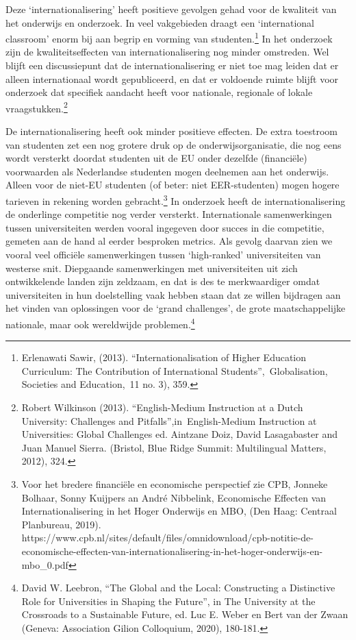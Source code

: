 \documentclass[empirical, authordate, ]{new-jote-article}
\begin{document}
	Deze ‘internationalisering' heeft positieve gevolgen gehad voor de kwaliteit van het onderwijs en onderzoek. In veel vakgebieden draagt een ‘international classroom' enorm bij aan begrip en vorming van studenten.\footnote{Erlenawati Sawir, (2013). “Internationalisation of Higher Education Curriculum: The Contribution of International Students”, Globalisation, Societies and Education, 11 no. 3), 359. } In het onderzoek zijn de kwaliteitseffecten van internationalisering nog minder omstreden. Wel blijft een discussiepunt dat de internationalisering er niet toe mag leiden dat er alleen internationaal wordt gepubliceerd, en dat er voldoende ruimte blijft voor onderzoek dat specifiek aandacht heeft voor nationale, regionale of lokale vraagstukken.\footnote{Robert Wilkinson (2013). “English-Medium Instruction at a Dutch University: Challenges and Pitfalls”,in English-Medium Instruction at Universities: Global Challenges ed. Aintzane Doiz, David Lasagabaster and Juan Manuel Sierra. (Bristol, Blue Ridge Summit: Multilingual Matters, 2012), 324. }



	De internationalisering heeft ook minder positieve effecten. De extra toestroom van studenten zet een nog grotere druk op de onderwijsorganisatie, die nog eens wordt versterkt doordat studenten uit de EU onder dezelfde (financiële) voorwaarden als Nederlandse studenten mogen deelnemen aan het onderwijs. Alleen voor de niet-EU studenten (of beter: niet EER-studenten) mogen hogere tarieven in rekening worden gebracht.\footnote{Voor het bredere financiële en economische perspectief zie CPB, Jonneke Bolhaar, Sonny Kuijpers an André Nibbelink, Economische Effecten van Internationalisering in het Hoger Onderwijs en MBO, (Den Haag: Centraal Planbureau, 2019). https://www.cpb.nl/sites/default/files/omnidownload/cpb-notitie-de-economische-effecten-van-internationalisering-in-het-hoger-onderwijs-en-mbo\_0.pdf} In onderzoek heeft de internationalisering de onderlinge competitie nog verder versterkt. Internationale samenwerkingen tussen universiteiten werden vooral ingegeven door succes in die competitie, gemeten aan de hand al eerder besproken metrics. Als gevolg daarvan zien we vooral veel officiële samenwerkingen tussen ‘high-ranked' universiteiten van westerse snit. Diepgaande samenwerkingen met universiteiten uit zich ontwikkelende landen zijn zeldzaam, en dat is des te merkwaardiger omdat universiteiten in hun doelstelling vaak hebben staan dat ze willen bijdragen aan het vinden van oplossingen voor de ‘grand challenges', de grote maatschappelijke nationale, maar ook wereldwijde problemen.\footnote{David W. Leebron, “The Global and the Local: Constructing a Distinctive Role for Universities in Shaping the Future”, in The University at the Crossroads to a Sustainable Future, ed. Luc E. Weber en Bert van der Zwaan (Geneva: Association Gilion Colloquium, 2020), 180-181.}
\end{document}
